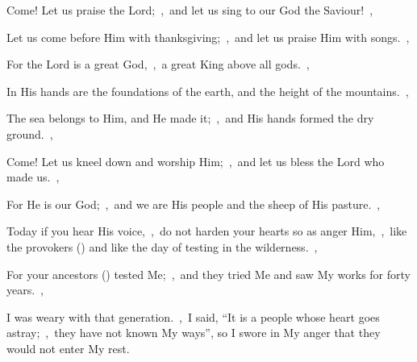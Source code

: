 \documentclass[12pt,twoside,a5paper]{article}
\begin{document}

\begin{normalparskip}
  Come! Let us praise the Lord;~\sep\ and let us sing to our God the Saviour!~\sep


  Let us come before Him with thanksgiving;~\sep\ and let us praise Him with songs.~\sep

  For the Lord is a great God,~\sep\ a great King above all gods.~\sep

  In His hands are the foundations of the earth, and the height of the mountains.~\sep

  The sea belongs to Him, and He made it;~\sep\ and His hands formed the dry ground.~\sep

  Come! Let us kneel down and worship Him;~\sep\ and let us bless the Lord who made us.~\sep

  For He is our God;~\sep\ and we are His people and the sheep of His pasture.~\sep

  Today if you hear His voice,~\sep\ do not harden your hearts so as anger Him,~\sep\ like the provokers () and like the day of testing in the wilderness.~\sep

  For your ancestors () tested Me;~\sep\ and they tried Me and saw My works for forty years.~\sep

  I was weary with that generation.~\sep\ I said, ``It is a people whose heart goes astray;~\sep\ they have not known My ways'', so I swore in My anger that they would not enter My rest.
\end{normalparskip}



\end{document}
